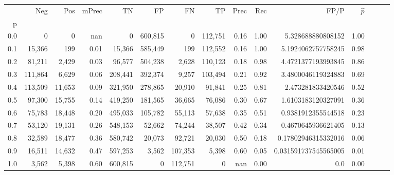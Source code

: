 \begin{tabular}{rrrrrrrrrrrrrrr}
\toprule
{} &      Neg &     Pos & mPrec &       TN &       FP &       FN &       TP &  Prec &   Rec &                  FP/P & $\hat{p}$ \\
p   &          &         &       &          &          &          &          &       &       &                       &           \\
\midrule
0.0 &        0 &       0 &   nan &        0 &  600,815 &        0 &  112,751 &  0.16 &  1.00 &     5.328688880808152 &      1.00 \\
0.1 &   15,366 &     199 &  0.01 &   15,366 &  585,449 &      199 &  112,552 &  0.16 &  1.00 &    5.1924062757758245 &      0.98 \\
0.2 &   81,211 &   2,429 &  0.03 &   96,577 &  504,238 &    2,628 &  110,123 &  0.18 &  0.98 &    4.4721377193993845 &      0.86 \\
0.3 &  111,864 &   6,629 &  0.06 &  208,441 &  392,374 &    9,257 &  103,494 &  0.21 &  0.92 &    3.4800046119324883 &      0.69 \\
0.4 &  113,509 &  11,653 &  0.09 &  321,950 &  278,865 &   20,910 &   91,841 &  0.25 &  0.81 &     2.473281833420546 &      0.52 \\
0.5 &   97,300 &  15,755 &  0.14 &  419,250 &  181,565 &   36,665 &   76,086 &  0.30 &  0.67 &    1.6103183120327091 &      0.36 \\
0.6 &   75,783 &  18,448 &  0.20 &  495,033 &  105,782 &   55,113 &   57,638 &  0.35 &  0.51 &    0.9381912355544518 &      0.23 \\
0.7 &   53,120 &  19,131 &  0.26 &  548,153 &   52,662 &   74,244 &   38,507 &  0.42 &  0.34 &    0.4670645936621405 &      0.13 \\
0.8 &   32,589 &  18,477 &  0.36 &  580,742 &   20,073 &   92,721 &   20,030 &  0.50 &  0.18 &   0.17802946315332016 &      0.06 \\
0.9 &   16,511 &  14,632 &  0.47 &  597,253 &    3,562 &  107,353 &    5,398 &  0.60 &  0.05 &  0.031591737545565005 &      0.01 \\
1.0 &    3,562 &   5,398 &  0.60 &  600,815 &        0 &  112,751 &        0 &   nan &  0.00 &                   0.0 &      0.00 \\
\bottomrule
\end{tabular}
